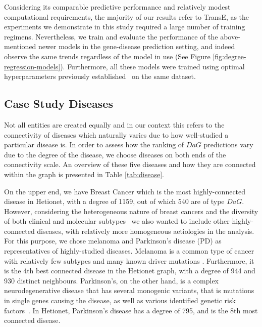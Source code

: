 Considering its comparable predictive performance and relatively modest computational requirements, the majority of our results refer to TransE, as the experiments we demonstrate in this study required a large number of training regimens. Nevertheless, we train and evaluate the performance of the above-mentioned newer models in the gene-disease prediction setting, and indeed observe the same trends regardless of the model in use (See Figure \ref{fig:degree-regression-models}). Furthermore, all these models were trained using optimal hyperparameters previously established~\cite{bonner2021understanding} on the same dataset.

\subsection{Case Study Diseases}\label{ssec:dis}

Not all entities are created equally and in our context this refers to the connectivity of diseases which naturally varies due to how well-studied a particular disease is. In order to assess how the ranking of \(DaG\) predictions vary due to the degree of the disease, we choose diseases on both ends of the connectivity scale. An overview of these five diseases and how they are connected within the graph is presented in Table \ref{tab:disease}.

On the upper end, we have Breast Cancer which is the most highly-connected disease in Hetionet, with a degree of 1159, out of which 540 are of type \(DaG\). However, considering the heterogeneous nature of breast cancers and the diversity of both clinical and molecular subtypes~\cite{szymiczek2021bc} we also wanted to include other highly-connected diseases, with relatively more homogeneous aetiologies in the analysis. For this purpose, we chose melanoma and Parkinson's disease (PD) as representatives of  highly-studied diseases. Melanoma is a common type of cancer with relatively few subtypes and many known driver mutations \cite{rabbie2019melanoma}. Furthermore, it is the 4th best connected disease in the Hetionet graph, with a degree of 944 and 930 distinct neighbours. Parkinson's, on the other hand, is a complex neurodegenerative disease that has several monogenic variants, that is mutations in single genes causing the disease, as well as various identified genetic risk factors~\cite{hernandez2016Parkinson}. In Hetionet, Parkinson's disease has a degree of 795, and is the 8th most connected disease.

